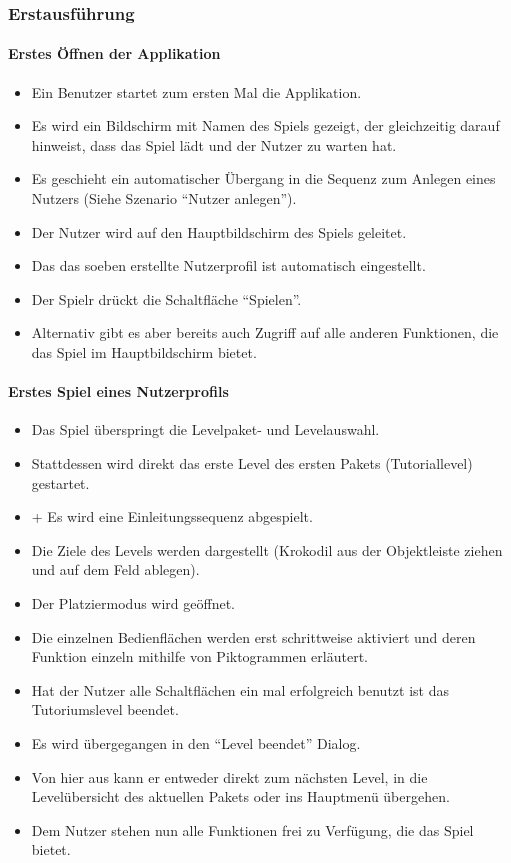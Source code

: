 \subsubsection{Erstausführung}
\paragraph{Erstes Öffnen der Applikation}\mbox{}\newline
\begin{itemize}
\item Ein Benutzer startet zum ersten Mal die Applikation. 
\item Es wird ein Bildschirm mit Namen des Spiels gezeigt, der gleichzeitig darauf
hinweist, dass das Spiel lädt und der Nutzer zu warten hat.
\item Es geschieht ein automatischer Übergang in die Sequenz zum
Anlegen eines Nutzers (Siehe Szenario ``Nutzer anlegen'').
\item Der Nutzer wird auf den Hauptbildschirm des Spiels geleitet. 
\item Das das soeben erstellte Nutzerprofil ist automatisch eingestellt.
\item Der Spielr drückt die Schaltfläche ``Spielen''.
\item Alternativ gibt es aber bereits auch Zugriff auf alle anderen Funktionen,
die das Spiel im Hauptbildschirm bietet.
\end{itemize}

\paragraph{Erstes Spiel eines Nutzerprofils}\mbox{}\newline
\begin{itemize}
\item Das Spiel überspringt die Levelpaket- und Levelauswahl.
\item Stattdessen wird direkt das erste Level des ersten Pakets (Tutoriallevel) gestartet.
\item + Es wird eine Einleitungssequenz abgespielt.
\item Die Ziele des Levels werden dargestellt (Krokodil aus der Objektleiste ziehen und auf dem Feld ablegen).
\item Der Platziermodus wird geöffnet.
\item Die einzelnen Bedienflächen werden erst schrittweise aktiviert und deren Funktion
einzeln mithilfe von Piktogrammen erläutert. 
\item Hat der Nutzer alle Schaltflächen ein mal erfolgreich benutzt ist das Tutoriumslevel beendet.
\item Es wird übergegangen in den ``Level beendet'' Dialog. 
\item Von hier aus kann er entweder direkt zum nächsten Level, in die Levelübersicht des aktuellen Pakets oder
ins Hauptmenü übergehen.
\item Dem Nutzer stehen nun alle Funktionen frei zu Verfügung, die das Spiel 
bietet.
\end{itemize}
